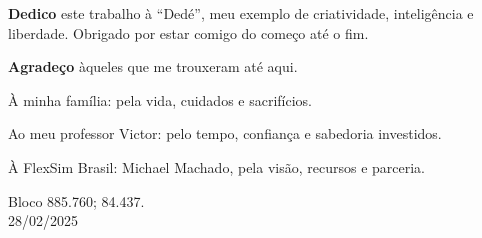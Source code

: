 \documentclass[
    12pt,                %
    openright,           %
    oneside,             %
    a4paper,             %
    english,             %
    spanish,             %
    brazil               %
]{ufscar}
\begin{document}
\begin{folhadeaprovacao}
\end{folhadeaprovacao}

\cleardoublepage %
\vspace*{\fill} %
\begin{flushright}
    \begin{minipage}{0.6\textwidth} %
        \justifying %
        \textbf{Dedico} este trabalho à ``Dedé'', meu exemplo de criatividade, inteligência e liberdade. Obrigado por estar comigo do começo até o fim.
    \end{minipage}
\end{flushright}

\cleardoublepage %


\cleardoublepage %
\vspace*{\fill} %
\begin{flushright}
    \begin{minipage}{0.6\textwidth} %
        \justifying %
        \textbf{Agradeço} àqueles que me trouxeram até aqui.
      
        À minha família: pela vida, cuidados e sacrifícios.

        Ao meu professor Victor: pelo tempo, confiança e sabedoria investidos. 

        À FlexSim Brasil: Michael Machado, pela visão, recursos e parceria.
    \end{minipage}
\end{flushright}

\cleardoublepage %


\vspace*{\fill} %
\begin{flushright}
    
        \centering %
        Bloco 885.760; 84.437. \\
        28/02/2025
\end{flushright}
\end{document}
